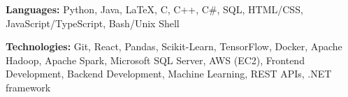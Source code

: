 
\textbf{Languages:} Python, Java, LaTeX, C, C++, C\#, SQL, HTML/CSS, JavaScript/TypeScript, Bash/Unix Shell

\textbf{Technologies:} Git, React, Pandas, Scikit-Learn, TensorFlow, Docker, Apache Hadoop, Apache Spark, Microsoft SQL Server, AWS (EC2), Frontend Development, Backend Development, Machine Learning, REST APIs, .NET framework